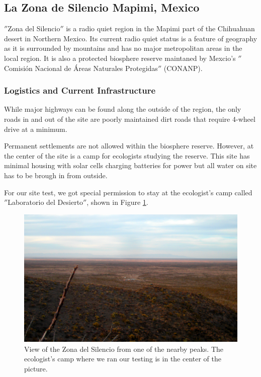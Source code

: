\subsection{La Zona de Silencio Mapimi, Mexico}
$''$Zona del Silencio$''$ is a radio quiet region in the Mapimi part of the Chihuahuan desert in Northern Mexico. Its current radio quiet status is a feature of geography as it is surrounded by mountains and has no major metropolitan areas in the local region. It is also a protected biosphere reserve maintaned by Mexcio's $''$Comisi\'{o}n Nacional de \'{A}reas Naturales Protegidas$''$ (CONANP). 

\subsubsection{Logistics and Current Infrastructure}
While major highways can be found along the outside of the region, the only roads in and out of the site are poorly maintained dirt roads that require 4-wheel drive at a minimum. 

Permanent settlements are not allowed within the biosphere reserve. However, at the center of the site is a camp for ecologists studying the reserve. This site has minimal housing with solar cells charging batteries for power but all water on site has to be brough in from outside. 

For our site test, we got special permission to stay at the ecologist's camp called $''$Laboratorio del Desierto$''$, shown in Figure \ref{Fig:zdsover}.


\begin{figure}[htb]
\begin{center}

\includegraphics[width=0.95\linewidth]{RFI_testing/figures/zds_overview_shot.jpg}
\caption{View of the Zona del Silencio from one of the nearby peaks. The ecologist's camp where we ran our testing is in the center of the picture.}
\label{Fig:zdsover}
\end{center}
\end{figure}

